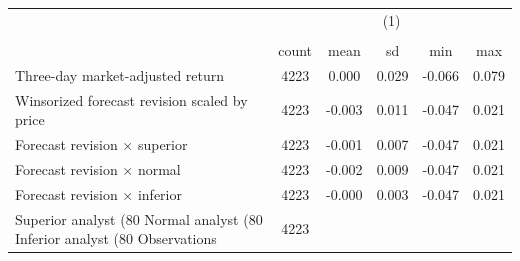 {
\def\sym#1{\ifmmode^{#1}\else\(^{#1}\)\fi}
\begin{tabular}{l*{1}{ccccc}}
\hline\hline
                    &\multicolumn{5}{c}{(1)}                                         \\
                    &\multicolumn{5}{c}{}                                            \\
                    &       count&        mean&          sd&         min&         max\\
\hline
Three-day market-adjusted return&        4223&       0.000&       0.029&      -0.066&       0.079\\
Winsorized forecast revision scaled by price&        4223&      -0.003&       0.011&      -0.047&       0.021\\
Forecast revision × superior&        4223&      -0.001&       0.007&      -0.047&       0.021\\
Forecast revision × normal&        4223&      -0.002&       0.009&      -0.047&       0.021\\
Forecast revision × inferior&        4223&      -0.000&       0.003&      -0.047&       0.021\\
Superior analyst (80%
Normal analyst (80%
Inferior analyst (80%
\hline
Observations        &        4223&            &            &            &            \\
\hline\hline
\end{tabular}
}

